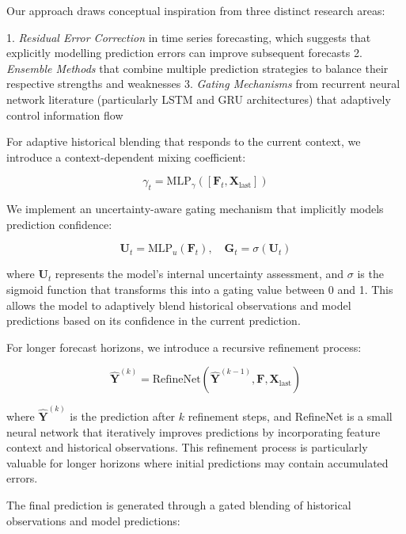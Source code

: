 \documentclass[lettersize, journal]{IEEEtran}
\begin{document}
Our approach draws conceptual inspiration from three distinct research areas:

1. \textit{Residual Error Correction} in time series forecasting, which suggests that explicitly modelling prediction errors can improve subsequent forecasts
2. \textit{Ensemble Methods} that combine multiple prediction strategies to balance their respective strengths and weaknesses
3. \textit{Gating Mechanisms} from recurrent neural network literature (particularly LSTM and GRU architectures) that adaptively control information flow

For adaptive historical blending that responds to the current context, we introduce a context-dependent mixing coefficient:

\begin{equation}
\gamma_t = \text{MLP}_{\gamma}([\mathbf{F}_t, \mathbf{X}_{\text{last}}])
\end{equation}

We implement an uncertainty-aware gating mechanism that implicitly models prediction confidence:

\begin{equation}
\mathbf{U}_t = \text{MLP}_u(\mathbf{F}_t), \quad \mathbf{G}_t = \sigma(\mathbf{U}_t)
\end{equation}

where $\mathbf{U}_t$ represents the model's internal uncertainty assessment, and $\sigma$ is the sigmoid function that transforms this into a gating value between 0 and 1. This allows the model to adaptively blend historical observations and model predictions based on its confidence in the current prediction.

For longer forecast horizons, we introduce a recursive refinement process:

\begin{equation}
\hat{\mathbf{Y}}^{(k)} = \text{RefineNet}(\hat{\mathbf{Y}}^{(k-1)}, \mathbf{F}, \mathbf{X}_{\text{last}})
\end{equation}

where $\hat{\mathbf{Y}}^{(k)}$ is the prediction after $k$ refinement steps, and RefineNet is a small neural network that iteratively improves predictions by incorporating feature context and historical observations. This refinement process is particularly valuable for longer horizons where initial predictions may contain accumulated errors.

The final prediction is generated through a gated blending of historical observations and model predictions:
\end{document}
